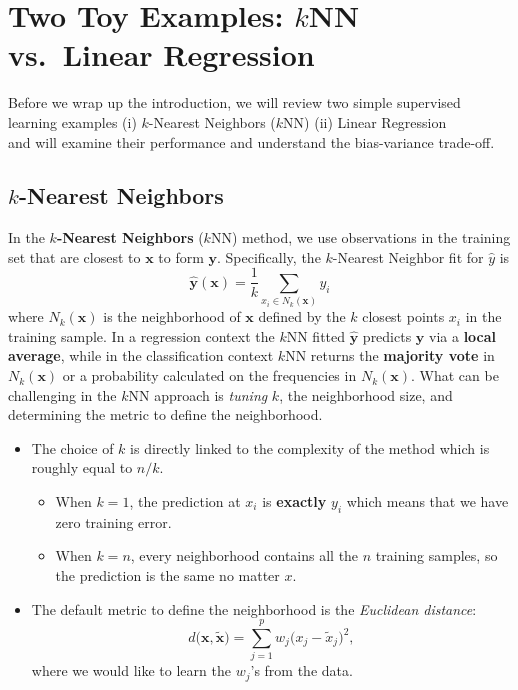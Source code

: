 \documentclass[
]{book}
\begin{document}
\section{\texorpdfstring{Two Toy Examples: \(k\)NN vs.~Linear Regression}{Two Toy Examples: kNN vs.~Linear Regression}}\label{two-toy-examples-knn-vs.-linear-regression}

Before we wrap up the introduction, we will review two simple supervised learning examples
(i) \(k\)-Nearest Neighbors (\(k\)NN)
(ii) Linear Regression\\
and will examine their performance and understand the bias-variance trade-off.

\subsection{\texorpdfstring{\(k\)-Nearest Neighbors}{k-Nearest Neighbors}}\label{k-nearest-neighbors}

In the \textbf{\(k\)-Nearest Neighbors} (\(k\)NN) method, we use observations in the training set that are closest to \(\mathbf{x}\) to form \(\mathbf{y}\). Specifically, the \(k\)-Nearest Neighbor fit for \(\hat{y}\) is
\[\hat{\mathbf{y}}(\mathbf{x}) = \frac{1}{k} \sum_{x_i \in N_k(\mathbf{x})} y_i\]
where \(N_k(\mathbf{x})\) is the neighborhood of \(\mathbf{x}\) defined by the \(k\) closest points \(x_i\) in the training sample. In a regression context the \(k\)NN fitted \(\mathbf{\hat{y}}\) predicts \(\mathbf{y}\) via a \textbf{local average}, while in the classification context \(k\)NN returns the \textbf{majority vote} in \(N_k(\mathbf{x})\) or a probability calculated on the frequencies in \(N_k(\mathbf{x})\). What can be challenging in the \(k\)NN approach is \emph{tuning} \(k\), the neighborhood size, and determining the metric to define the neighborhood.

\begin{itemize}
\item
  The choice of \(k\) is directly linked to the complexity of the method which is roughly equal to \(n/k\).

  \begin{itemize}
  \item
    When \(k=1\), the prediction at \(x_i\) is \textbf{exactly} \(y_i\) which means that we have zero training error.
  \item
    When \(k=n\), every neighborhood contains all the \(n\) training samples, so the prediction is the same no matter \(x\).
  \end{itemize}
\item
  The default metric to define the neighborhood is the \emph{Euclidean distance}:
  \[d\bigl( \mathbf{x}, \tilde{\mathbf{x}} \bigr) = \sum_{j=1}^{p} w_j \bigl( x_j - \tilde{x}_j \bigr)^2,\]
  where we would like to learn the \(w_j\)'s from the data.
\end{itemize}
\end{document}
